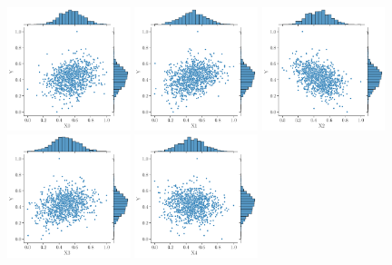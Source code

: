 \begin{figure}
  \centering
  \includegraphics[width=0.32\textwidth]{./part2/figures/SIS/cathare_jointplot_X0.pdf}
  \includegraphics[width=0.32\textwidth]{./part2/figures/SIS/cathare_jointplot_X1.pdf}
  \includegraphics[width=0.32\textwidth]{./part2/figures/SIS/cathare_jointplot_X2.pdf}\\
  \includegraphics[width=0.32\textwidth]{./part2/figures/SIS/cathare_jointplot_X3.pdf}
  \includegraphics[width=0.32\textwidth]{./part2/figures/SIS/cathare_jointplot_X4.pdf}

\end{figure}

